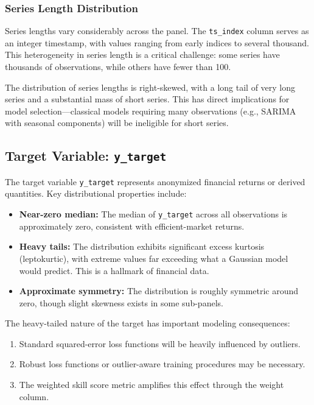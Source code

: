 \subsubsection{Series Length Distribution}

Series lengths vary considerably across the panel. The \texttt{ts\_index} column serves as an integer timestamp, with values ranging from early indices to several thousand. This heterogeneity in series length is a critical challenge: some series have thousands of observations, while others have fewer than 100.

The distribution of series lengths is right-skewed, with a long tail of very long series and a substantial mass of short series. This has direct implications for model selection---classical models requiring many observations (e.g., SARIMA with seasonal components) will be ineligible for short series.

\subsection{Target Variable: \texttt{y\_target}}

The target variable \texttt{y\_target} represents anonymized financial returns or derived quantities. Key distributional properties include:

\begin{itemize}
    \item \textbf{Near-zero median:} The median of \texttt{y\_target} across all observations is approximately zero, consistent with efficient-market returns.
    \item \textbf{Heavy tails:} The distribution exhibits significant excess kurtosis (leptokurtic), with extreme values far exceeding what a Gaussian model would predict. This is a hallmark of financial data.
    \item \textbf{Approximate symmetry:} The distribution is roughly symmetric around zero, though slight skewness exists in some sub-panels.
\end{itemize}

The heavy-tailed nature of the target has important modeling consequences:
\begin{enumerate}
    \item Standard squared-error loss functions will be heavily influenced by outliers.
    \item Robust loss functions or outlier-aware training procedures may be necessary.
    \item The weighted skill score metric amplifies this effect through the weight column.
\end{enumerate}


